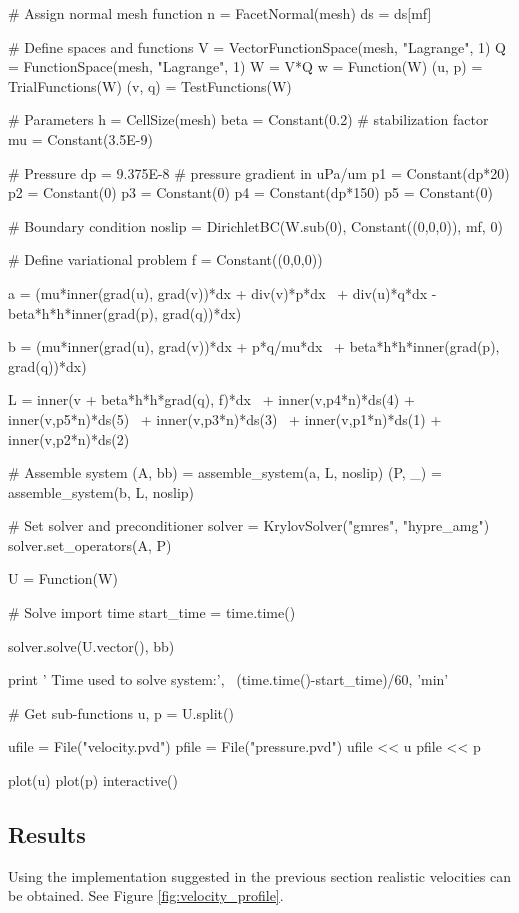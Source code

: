 \documentclass[epsfig,11pt]{article}
\begin{document}
\begin{python}
# Assign normal mesh function
n = FacetNormal(mesh)
ds = ds[mf]

# Define spaces and functions
V = VectorFunctionSpace(mesh, "Lagrange", 1)
Q = FunctionSpace(mesh, "Lagrange", 1)
W = V*Q
w = Function(W)
(u, p) = TrialFunctions(W)
(v, q) = TestFunctions(W)

# Parameters
h = CellSize(mesh)   
beta = Constant(0.2)        # stabilization factor
mu = Constant(3.5E-9)

# Pressure
dp = 9.375E-8               # pressure gradient in uPa/um
p1 = Constant(dp*20)
p2 = Constant(0)
p3 = Constant(0)
p4 = Constant(dp*150)
p5 = Constant(0)

# Boundary condition
noslip = DirichletBC(W.sub(0), Constant((0,0,0)), mf, 0)

# Define variational problem
f = Constant((0,0,0))

a = (mu*inner(grad(u), grad(v))*dx + div(v)*p*dx \
    + div(u)*q*dx - beta*h*h*inner(grad(p), grad(q))*dx)

b = (mu*inner(grad(u), grad(v))*dx + p*q/mu*dx \
    + beta*h*h*inner(grad(p), grad(q))*dx)

L =  inner(v + beta*h*h*grad(q), f)*dx \
   + inner(v,p4*n)*ds(4) + inner(v,p5*n)*ds(5) \
   + inner(v,p3*n)*ds(3)  \
   + inner(v,p1*n)*ds(1) + inner(v,p2*n)*ds(2)

# Assemble system
(A, bb) = assemble_system(a, L, noslip)
(P, _) = assemble_system(b, L, noslip)

# Set solver and preconditioner
solver = KrylovSolver("gmres", "hypre_amg")
solver.set_operators(A, P)

U = Function(W)

# Solve
import time
start_time = time.time()

solver.solve(U.vector(), bb)

print ' \n Time used to solve system:', \
       (time.time()-start_time)/60, 'min'

# Get sub-functions
u, p = U.split()

ufile = File("velocity.pvd")
pfile = File("pressure.pvd")
ufile << u
pfile << p

plot(u)
plot(p)
interactive()
\end{python}

\subsection{Results}

Using the implementation suggested in the previous section realistic velocities can be obtained. See Figure \ref{fig:velocity_profile}.
\end{document}
